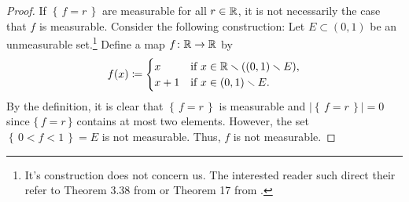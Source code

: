 \begin{proof}
If $\left\{\,f=r\,\right\}$ are measurable for all $r\in\mathbb{R}$, it is not
necessarily the case that $f$ is measurable. Consider the following
construction: Let $E\subset(0,1)$ be an unmeasurable set.\footnote{It's
  construction does not concern us. The interested reader such direct their
  refer to Theorem 3.38 from \cite[Ch.\@ 3, p.\@ 57-58]{wheeden-zygmund} or
  Theorem 17 from \cite[Ch.\@ 2\S 7, p.\@ 48]{royden}.} Define a map
$f\colon\mathbb{R}\to\mathbb{R}$ by
\begin{equation}
\label{eq:prep:1:11}
f(x)\coloneq
\begin{cases}
x&\text{if $x\in\mathbb{R}\smallsetminus((0,1)\smallsetminus E)$},\\
x+1&\text{if $x\in (0,1)\smallsetminus E$.}
\end{cases}
\end{equation}
By the definition, it is clear that $\left\{\,f=r\,\right\}$ is measurable
and $\left|\left\{\,f=r\,\right\}\right|=0$ since $\{\,f=r\,\}$ contains at
most two elements. However, the set $\left\{\,0<f<1\,\right\}=E$ is not
measurable. Thus, $f$ is not measurable.
\end{proof}

